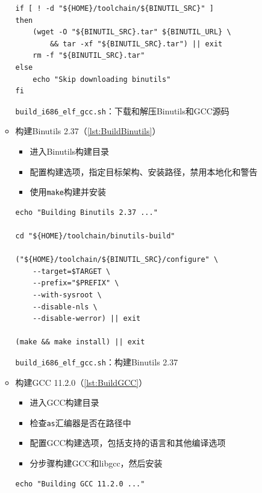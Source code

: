 \begin{enumerate}
\begin{itemize}
\begin{listing}[htbp]
\begin{verbatim}
if [ ! -d "${HOME}/toolchain/${BINUTIL_SRC}" ]
then
    (wget -O "${BINUTIL_SRC}.tar" ${BINUTIL_URL} \
        && tar -xf "${BINUTIL_SRC}.tar") || exit
    rm -f "${BINUTIL_SRC}.tar"
else
    echo "Skip downloading binutils"
fi
                    \end{verbatim}
                        \caption{\texttt{build\_i686\_elf\_gcc.sh}：下载和解压Binutils和GCC源码}\label{lst:DownloadAndExtractSourceCode}
                    \end{listing}
              \item 构建Binutils 2.37（\cref{lst:BuildBinutils}）
                    \begin{itemize}
                        \item 进入Binutils构建目录
                        \item 配置构建选项，指定目标架构、安装路径，禁用本地化和警告
                        \item 使用\texttt{make}构建并安装
                    \end{itemize}
                    \begin{listing}[htbp]
                        \begin{verbatim}
echo "Building Binutils 2.37 ..."

cd "${HOME}/toolchain/binutils-build"

("${HOME}/toolchain/${BINUTIL_SRC}/configure" \
    --target=$TARGET \
    --prefix="$PREFIX" \
    --with-sysroot \
    --disable-nls \
    --disable-werror) || exit

(make && make install) || exit
                    \end{verbatim}
                        \caption{\texttt{build\_i686\_elf\_gcc.sh}：构建Binutils 2.37}\label{lst:BuildBinutils}
                    \end{listing}
              \item 构建GCC 11.2.0（\cref{lst:BuildGCC}）
                    \begin{itemize}
                        \item 进入GCC构建目录
                        \item 检查\texttt{as}汇编器是否在路径中
                        \item 配置GCC构建选项，包括支持的语言和其他编译选项
                        \item 分步骤构建GCC和libgcc，然后安装
                    \end{itemize}
                    \begin{listing}[htbp]
                        \begin{verbatim}
echo "Building GCC 11.2.0 ..."


\end{verbatim}
\end{listing}
\end{itemize}
\end{enumerate}
